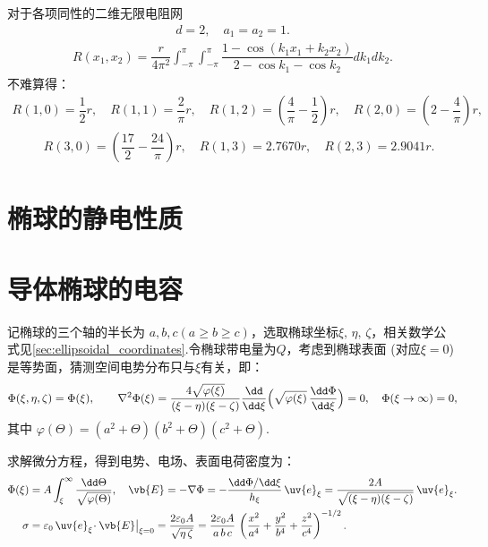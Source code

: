 \begin{exbox}
	对于各项同性的二维无限电阻网
	\begin{align*}
		d = 2, \quad a_1 = a_2 = 1.
	\end{align*}
	\begin{align*}
		R(x_1, x_2) = \dfrac{r}{4\pi^2} \int_{-\pi}^{\pi} \int_{-\pi}^{\pi} \dfrac{1 - \cos\left( k_1 x_1 + k_2 x_2 \right)}{2 - \cos k_1 - \cos k_2} dk_1 dk_2.
	\end{align*}
	不难算得：
	\begin{align*}
		R(1, 0) = \dfrac{1}{2} r, \quad R(1, 1) = \dfrac{2}{\pi} r, \quad R(1, 2) = \left( \dfrac{4}{\pi} - \dfrac{1}{2} \right) r, \quad R(2, 0) = \left( 2 - \dfrac{4}{\pi} \right) r,
	\end{align*}
	\begin{align*}
		\quad R(3, 0) = \left( \dfrac{17}{2} - \dfrac{24}{\pi} \right) r, \quad R(1, 3) = 2.7670 r, \quad R(2, 3) = 2.9041 r.
	\end{align*}
\end{exbox}

\section{椭球的静电性质}
\section{导体椭球的电容}
记椭球的三个轴的半长为  \(a, b, c (a\geq b \geq c)\)，选取椭球坐标\(\xi,\,\eta,\,\zeta\)，相关数学公式见\cref{sec:ellipsoidal_coordinates}.令椭球带电量为\(Q\)，考虑到椭球表面 (对应\(\xi = 0\)) 是等势面，猜测空间电势分布只与\(\xi\)有关，即：
\begin{align*}
	\Phi(\xi,\eta,\zeta)=\Phi(\xi),
	\qquad
	\nabla^2\Phi(\xi)
	=\frac{4\sqrt{\varphi(\xi)}}{(\xi-\eta)(\xi-\zeta)}
	\frac{\dd}{\dd \xi}\Bigl(\sqrt{\varphi(\xi)}\,
	\frac{\dd \Phi}{\dd \xi}\Bigr)
	=0,
	\quad
	\Phi(\xi\to\infty)=0,
\end{align*}
其中
\(\displaystyle
\varphi(\Theta)=(a^2+\Theta)(b^2+\Theta)(c^2+\Theta).
\)

求解微分方程，得到电势、电场、表面电荷密度为：
\begin{align*}
	\Phi(\xi)
	&=A \int_{\xi}^{\infty}\frac{\dd \Theta}{\sqrt{\varphi(\Theta)}},\quad
	\vb{E}
	=-\nabla\Phi
	=-\frac{\dd \Phi/\dd \xi}{h_{\xi}}\,
	\uv{e}_{\xi}
	=\frac{2A}{\sqrt{(\xi-\eta)(\xi-\zeta)}}\,
	\uv{e}_{\xi}.\\
	\sigma
	&=\varepsilon_{0}\,\uv{e}_{\xi}\!\cdot\vb{E}\big|_{\xi=0}
	=\frac{2\varepsilon_{0}A}{\sqrt{\eta\,\zeta}}
	=\frac{2\varepsilon_{0}A}{a\,b\,c}\,\left( \frac{x^2}{a^4} + \frac{y^2}{b^4} + \frac{z^2}{c^4} \right)^{-1/2}.
\end{align*}

